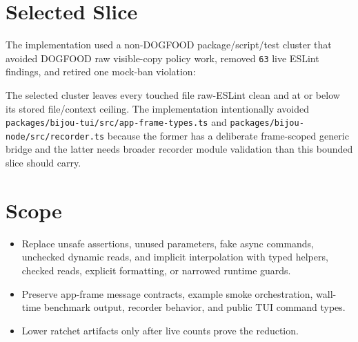\section{Selected Slice}\label{record-227-selected-slice}

The implementation used a non-DOGFOOD package/script/test cluster that avoided DOGFOOD raw visible-copy policy work, removed \texttt{6\allowbreak{}3} live ESLint findings, and retired one mock-ban violation:



The selected cluster leaves every touched file raw-ESLint clean and at or below its stored file/context ceiling. The implementation intentionally avoided \texttt{p\allowbreak{}a\allowbreak{}c\allowbreak{}k\allowbreak{}a\allowbreak{}g\allowbreak{}e\allowbreak{}s\allowbreak{}/\allowbreak{}b\allowbreak{}i\allowbreak{}j\allowbreak{}o\allowbreak{}u\allowbreak{}-\allowbreak{}t\allowbreak{}u\allowbreak{}i\allowbreak{}/\allowbreak{}s\allowbreak{}r\allowbreak{}c\allowbreak{}/\allowbreak{}a\allowbreak{}p\allowbreak{}p\allowbreak{}-\allowbreak{}f\allowbreak{}r\allowbreak{}a\allowbreak{}m\allowbreak{}e\allowbreak{}-\allowbreak{}t\allowbreak{}y\allowbreak{}p\allowbreak{}e\allowbreak{}s\allowbreak{}.\allowbreak{}t\allowbreak{}s} and \texttt{p\allowbreak{}a\allowbreak{}c\allowbreak{}k\allowbreak{}a\allowbreak{}g\allowbreak{}e\allowbreak{}s\allowbreak{}/\allowbreak{}b\allowbreak{}i\allowbreak{}j\allowbreak{}o\allowbreak{}u\allowbreak{}-\allowbreak{}n\allowbreak{}o\allowbreak{}d\allowbreak{}e\allowbreak{}/\allowbreak{}s\allowbreak{}r\allowbreak{}c\allowbreak{}/\allowbreak{}r\allowbreak{}e\allowbreak{}c\allowbreak{}o\allowbreak{}r\allowbreak{}d\allowbreak{}e\allowbreak{}r\allowbreak{}.\allowbreak{}t\allowbreak{}s} because the former has a deliberate frame-scoped generic bridge and the latter needs broader recorder module validation than this bounded slice should carry.

\section{Scope}\label{record-227-scope}

\begin{itemize}
\tightlist
\item
  Replace unsafe assertions, unused parameters, fake async commands, unchecked dynamic reads, and implicit interpolation with typed helpers, checked reads, explicit formatting, or narrowed runtime guards.
\item
  Preserve app-frame message contracts, example smoke orchestration, wall-time benchmark output, recorder behavior, and public TUI command types.
\item
  Lower ratchet artifacts only after live counts prove the reduction.
\end{itemize}

